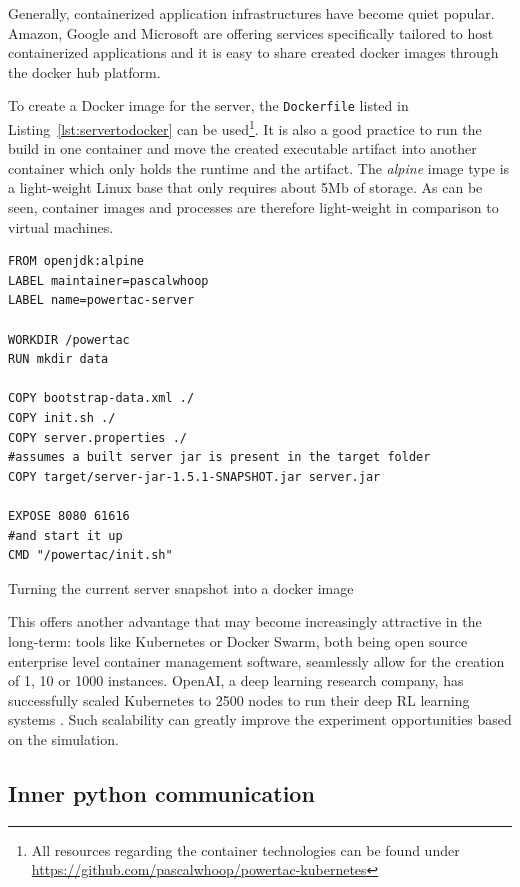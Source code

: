 Generally, containerized application infrastructures have become quiet popular. Amazon, Google and Microsoft are offering
services specifically tailored to host containerized applications and it is easy to share created docker images
through the docker hub platform.

To create a Docker image for the server, the \texttt{Dockerfile} listed in Listing~\ref{lst:servertodocker} can be
used\footnote{All resources regarding the container technologies can be found under
\url{https://github.com/pascalwhoop/powertac-kubernetes}}.
It is also a good practice to run the build in one container and move the created executable artifact into another
container which only holds the runtime and the artifact. The \emph{alpine} image type is a light-weight Linux base that
only requires about 5Mb of storage. As can be seen, container images and processes are therefore light-weight in
comparison to virtual machines.

\begin{listing}[h]

    \begin{verbatim}
FROM openjdk:alpine
LABEL maintainer=pascalwhoop
LABEL name=powertac-server

WORKDIR /powertac
RUN mkdir data

COPY bootstrap-data.xml ./
COPY init.sh ./
COPY server.properties ./
#assumes a built server jar is present in the target folder
COPY target/server-jar-1.5.1-SNAPSHOT.jar server.jar

EXPOSE 8080 61616
#and start it up
CMD "/powertac/init.sh"
    \end{verbatim}
    \caption{Turning the current server snapshot into a docker image}
    \label{lst:servertodocker}
\end{listing}

This offers another advantage that may become increasingly attractive in the long-term: tools like Kubernetes or Docker
Swarm, both being open source enterprise level container management software, seamlessly allow for the creation of 1, 10
or 1000 instances. OpenAI, a deep learning research company, has successfully scaled Kubernetes to 2500 nodes to run
their deep \ac{RL} learning systems \citep{openai2500}. Such scalability can greatly improve the experiment
opportunities based on the simulation.

\subsection{Inner python communication}%
\label{sub:inner_python_communication}

